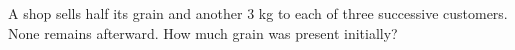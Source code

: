 A shop sells half its grain and another $3$ kg to each of three successive customers. None remains afterward. How much grain was present initially?
